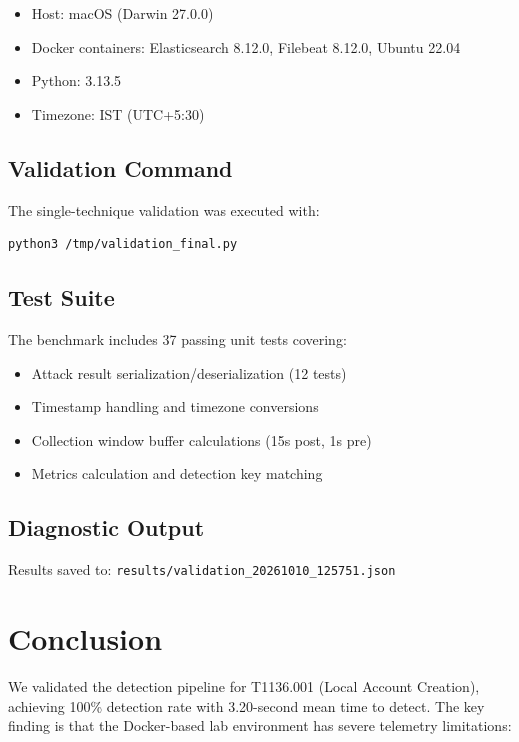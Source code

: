 \documentclass[11pt,a4paper]{article}
\begin{document}
\begin{itemize}
    \item Host: macOS (Darwin 27.0.0)
    \item Docker containers: Elasticsearch 8.12.0, Filebeat 8.12.0, Ubuntu 22.04
    \item Python: 3.13.5
    \item Timezone: IST (UTC+5:30)
\end{itemize}

\subsection{Validation Command}

The single-technique validation was executed with:

\begin{lstlisting}[language=bash]
python3 /tmp/validation_final.py
\end{lstlisting}

\subsection{Test Suite}

The benchmark includes 37 passing unit tests covering:
\begin{itemize}
    \item Attack result serialization/deserialization (12 tests)
    \item Timestamp handling and timezone conversions
    \item Collection window buffer calculations (15s post, 1s pre)
    \item Metrics calculation and detection key matching
\end{itemize}

\subsection{Diagnostic Output}

Results saved to: \texttt{results/validation\_20261010\_125751.json}

\section{Conclusion}

We validated the detection pipeline for T1136.001 (Local Account Creation), achieving 100\% detection rate with 3.20-second mean time to detect. The key finding is that the Docker-based lab environment has severe telemetry limitations:
\end{document}
